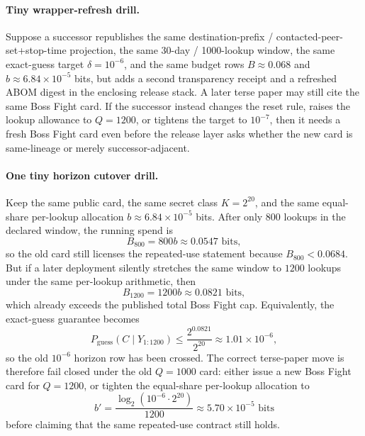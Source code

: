 \documentclass[11pt]{article}
\newcommand{\logtwo}{\log_2}
\begin{document}
\paragraph{Tiny wrapper-refresh drill.}
Suppose a successor republishes the same destination-prefix / contacted-peer-set+stop-time projection, the same 30-day / 1000-lookup window, the same exact-guess target $\delta=10^{-6}$, and the same budget rows $B\approx 0.068$ and $b\approx 6.84\times 10^{-5}$ bits, but adds a second transparency receipt and a refreshed ABOM digest in the enclosing release stack. A later terse paper may still cite the same Boss Fight card. If the successor instead changes the reset rule, raises the lookup allowance to $Q=1200$, or tightens the target to $10^{-7}$, then it needs a fresh Boss Fight card even before the release layer asks whether the new card is same-lineage or merely successor-adjacent.

\paragraph{One tiny horizon cutover drill.}
Keep the same public card, the same secret class $K=2^{20}$, and the same equal-share per-lookup allocation $b\approx 6.84\times 10^{-5}$ bits.
After only $800$ lookups in the declared window, the running spend is
\[
B_{800}=800b\approx 0.0547\text{ bits},
\]
so the old card still licenses the repeated-use statement because $B_{800}<0.0684$.
But if a later deployment silently stretches the same window to $1200$ lookups under the same per-lookup arithmetic, then
\[
B_{1200}=1200b\approx 0.0821\text{ bits},
\]
which already exceeds the published total Boss Fight cap.
Equivalently, the exact-guess guarantee becomes
\[
P_{\mathrm{guess}}(C\mid Y_{1:1200}) \le \frac{2^{0.0821}}{2^{20}} \approx 1.01\times 10^{-6},
\]
so the old $10^{-6}$ horizon row has been crossed.
The correct terse-paper move is therefore fail closed under the old $Q=1000$ card: either issue a new Boss Fight card for $Q=1200$, or tighten the equal-share per-lookup allocation to
\[
b' = \frac{\logtwo(10^{-6}\cdot 2^{20})}{1200} \approx 5.70\times 10^{-5}\text{ bits}
\]
before claiming that the same repeated-use contract still holds.
\end{document}
